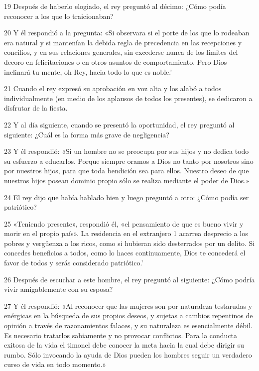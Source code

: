 \par 19 Después de haberlo elogiado, el rey preguntó al décimo: ¿Cómo podía reconocer a los que lo traicionaban?

\par 20 Y él respondió a la pregunta: «Si observara si el porte de los que lo rodeaban era natural y si mantenían la debida regla de precedencia en las recepciones y concilios, y en sus relaciones generales, sin excederse nunca de los límites del decoro en felicitaciones o en otros asuntos de comportamiento. Pero Dios inclinará tu mente, oh Rey, hacia todo lo que es noble.'

\par 21 Cuando el rey expresó su aprobación en voz alta y los alabó a todos individualmente (en medio de los aplausos de todos los presentes), se dedicaron a disfrutar de la fiesta.

\par 22 Y al día siguiente, cuando se presentó la oportunidad, el rey preguntó al siguiente: ¿Cuál es la forma más grave de negligencia?

\par 23 Y él respondió: «Si un hombre no se preocupa por sus hijos y no dedica todo su esfuerzo a educarlos. Porque siempre oramos a Dios no tanto por nosotros sino por nuestros hijos, para que toda bendición sea para ellos. Nuestro deseo de que nuestros hijos posean dominio propio sólo se realiza mediante el poder de Dios.»

\par 24 El rey dijo que había hablado bien y luego preguntó a otro: ¿Cómo podía ser patriótico?

\par 25 «Teniendo presente», respondió él, «el pensamiento de que es bueno vivir y morir en el propio país». La residencia en el extranjero 1 acarrea desprecio a los pobres y vergüenza a los ricos, como si hubieran sido desterrados por un delito. Si concedes beneficios a todos, como lo haces continuamente, Dios te concederá el favor de todos y serás considerado patriótico.'

\par 26 Después de escuchar a este hombre, el rey preguntó al siguiente: ¿Cómo podría vivir amigablemente con su esposa?

\par 27 Y él respondió: «Al reconocer que las mujeres son por naturaleza testarudas y enérgicas en la búsqueda de sus propios deseos, y sujetas a cambios repentinos de opinión a través de razonamientos falaces, y su naturaleza es esencialmente débil. Es necesario tratarlos sabiamente y no provocar conflictos. Para la conducta exitosa de la vida el timonel debe conocer la meta hacia la cual debe dirigir su rumbo. Sólo invocando la ayuda de Dios pueden los hombres seguir un verdadero curso de vida en todo momento.»

